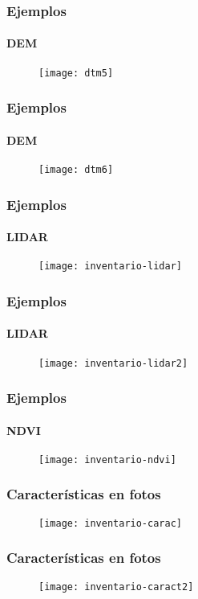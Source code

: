 \documentclass[12pt]{beamer}
\begin{document}
\begin{frame}
\frametitle{Ejemplos}
\framesubtitle{DEM}
\begin{figure}
   	\texttt{[image: dtm5]}
\end{figure}
\end{frame}
\begin{frame}
\frametitle{Ejemplos}
\framesubtitle{DEM}
\begin{figure}
   	\texttt{[image: dtm6]}
\end{figure}
\end{frame}
\begin{frame}
\frametitle{Ejemplos}
\framesubtitle{LIDAR}
\begin{figure}
   	\texttt{[image: inventario-lidar]}
\end{figure}
\end{frame}
\begin{frame}
\frametitle{Ejemplos}
\framesubtitle{LIDAR}
\begin{figure}
   	\texttt{[image: inventario-lidar2]}
\end{figure}
\end{frame}
\begin{frame}
\frametitle{Ejemplos}
\framesubtitle{NDVI}
\begin{figure}
   	\texttt{[image: inventario-ndvi]}
\end{figure}
\end{frame}
\begin{frame}
\frametitle{Características en fotos}
\begin{figure}
   	\texttt{[image: inventario-carac]}
\end{figure}
\end{frame}
\begin{frame}
\frametitle{Características en fotos}
\begin{figure}
   	\texttt{[image: inventario-caract2]}
\end{figure}
\end{frame}
\end{document}
